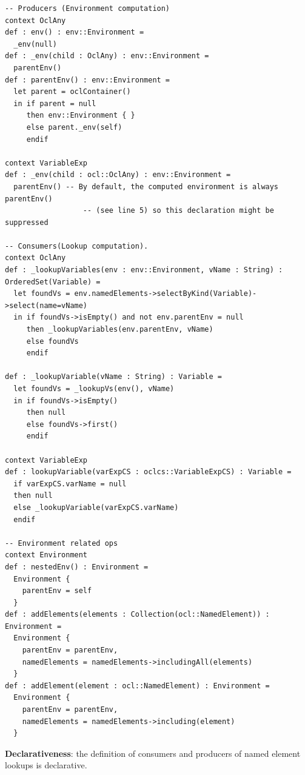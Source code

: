 \documentclass{llncs}
\begin{document}
\begin{lstlisting}[caption=Name resolution description for running example, label=lst:exampleNameResodesc, language=OCL]
-- Producers (Environment computation)
context OclAny
def : env() : env::Environment =
  _env(null)
def : _env(child : OclAny) : env::Environment =
  parentEnv()	
def : parentEnv() : env::Environment =
  let parent = oclContainer() 
  in if parent = null 
     then env::Environment { } 
     else parent._env(self) 
     endif
	
context VariableExp
def : _env(child : ocl::OclAny) : env::Environment =
  parentEnv() -- By default, the computed environment is always parentEnv()
                  -- (see line 5) so this declaration might be suppressed

-- Consumers(Lookup computation).
context OclAny 
def : _lookupVariables(env : env::Environment, vName : String) : OrderedSet(Variable) =  	
  let foundVs = env.namedElements->selectByKind(Variable)->select(name=vName) 
  in if foundVs->isEmpty() and not env.parentEnv = null
     then _lookupVariables(env.parentEnv, vName)
     else foundVs 
     endif
     
def : _lookupVariable(vName : String) : Variable =
  let foundVs = _lookupVs(env(), vName)
  in if foundVs->isEmpty()
     then null
     else foundVs->first() 
     endif
     
context VariableExp
def : lookupVariable(varExpCS : oclcs::VariableExpCS) : Variable =
  if varExpCS.varName = null
  then null 
  else _lookupVariable(varExpCS.varName) 
  endif
         
-- Environment related ops
context Environment
def : nestedEnv() : Environment = 
  Environment { 
    parentEnv = self
  }
def : addElements(elements : Collection(ocl::NamedElement)) : Environment =
  Environment {
    parentEnv = parentEnv,
    namedElements = namedElements->includingAll(elements)
  }
def : addElement(element : ocl::NamedElement) : Environment =
  Environment {
    parentEnv = parentEnv,
    namedElements = namedElements->including(element)
  }
\end{lstlisting}

\textbf{Declarativeness}: the definition of consumers and producers of named element lookups is declarative.
\end{document}
